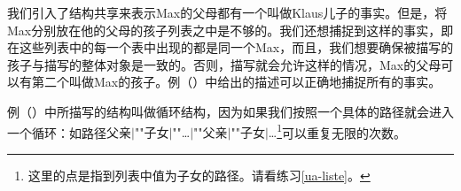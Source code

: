我们引入了结构共享来表示Max的父母都有一个叫做Klaus儿子的事实。但是，将Max分别放在他的父母的孩子列表之中是不够的。我们还想捕捉到这样的事实，即在这些列表中的每一个表中出现的都是同一个Max，而且，我们想要确保被描写的孩子与描写的整体对象是一致的。否则，描写就会允许这样的情况，Max的父母可以有第二个叫做Max的孩子。例（）中给出的描述可以正确地捕捉所有的事实。
\begin{figure}
\ea
\label{bsp-avm-zyklen}
 
\z
\vspace{-\baselineskip}\end{figure}%
例（）中所描写的结构叫做循环结构，因为如果我们按照一个具体的路径就会进入一个循环：如路径\textsc{父亲$|$""子女$|$""\ldots$|$""父亲$|$""子女$|$\ldots}\footnote{%
这里的点是指到列表中值为\textsc{子女}的路径。请看练习\ref{ua-liste}。
}可以重复无限的次数。

